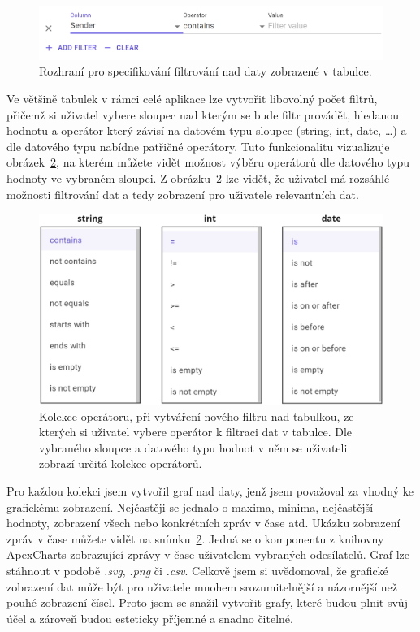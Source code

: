         \begin{figure}[H]
            \centering
            \includegraphics[scale=0.3]{obrazky-figures/Implementace/Blazor/TableFiltration.png}
            \caption{Rozhraní pro specifikování filtrování nad daty zobrazené v tabulce.}
            \label{fig:tableFilter}
        \end{figure}
        Ve většině tabulek v rámci celé aplikace lze vytvořit libovolný počet filtrů, přičemž si uživatel vybere sloupec nad kterým se bude filtr provádět, hledanou hodnotu a operátor který závisí na datovém typu sloupce (string, int, date, …) a dle datového typu nabídne patřičné operátory. Tuto funkcionalitu vizualizuje obrázek~\ref{fig:tableFilterOperators}, na kterém můžete vidět možnost výběru operátorů dle datového typu hodnoty ve vybraném sloupci. Z obrázku~\ref{fig:tableFilterOperators} lze vidět, že uživatel má rozsáhlé možnosti filtrování dat a tedy zobrazení pro uživatele relevantních dat.
        \begin{figure}[H]
            \centering
            \includegraphics[scale=0.22]{obrazky-figures/Implementace/Blazor/TableFilterOperators.jpg}
            \caption{Kolekce operátoru, při vytváření nového filtru nad tabulkou, ze kterých si uživatel vybere operátor k filtraci dat v tabulce. Dle vybraného sloupce a datového typu hodnot v něm se uživateli zobrazí určitá kolekce operátorů.}
            \label{fig:tableFilterOperators}
        \end{figure}

        Pro každou kolekci jsem vytvořil graf nad daty, jenž jsem považoval za vhodný ke grafickému zobrazení. Nejčastěji se jednalo o maxima, minima, nejčastější hodnoty, zobrazení všech nebo konkrétních zpráv v čase atd. Ukázku zobrazení zpráv v čase můžete vidět na snímku~\ref{fig:tableFilterOperators}. Jedná se o komponentu z knihovny ApexCharts zobrazující zprávy v čase uživatelem vybraných odesílatelů. Graf lze stáhnout v podobě \textit{.svg}, \textit{.png} či \textit{.csv}. Celkově jsem si uvědomoval, že grafické zobrazení dat může být pro uživatele mnohem srozumitelnější a názornější než pouhé zobrazení čísel. Proto jsem se snažil vytvořit grafy, které budou plnit svůj účel a zároveň budou esteticky příjemné a snadno čitelné.

